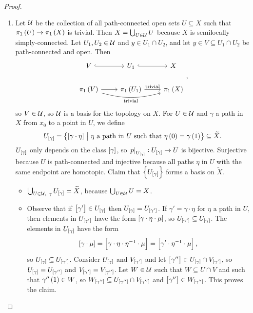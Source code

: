 \begin{proof}
\begin{enumerate}
\item Let $ \mathcal{U} $ be the collection of all path-connected open sets $ U \subseteq X $ such that $ \pi_1\br{U} \to \pi_1\br{X} $ is trivial. Then $ X = \bigcup_{U \in \mathcal{U}} U $ because $ X $ is semilocally simply-connected. Let $ U_1, U_2 \in \mathcal{U} $ and $ y \in U_1 \cap U_2 $, and let $ y \in V \subseteq U_1 \cap U_2 $ be path-connected and open. Then
$$
\begin{tikzcd}
V \arrow[hookrightarrow]{r} & U_1 \arrow[hookrightarrow]{r} & X \\
\pi_1\br{V} \arrow{r} \arrow[bend right=15, swap]{rr}{\text{trivial}} & \pi_1\br{U_1} \arrow{r}{\text{trivial}} & \pi_1\br{X}
\end{tikzcd},
$$
so $ V \in \mathcal{U} $, so $ \mathcal{U} $ is a basis for the topology on $ X $. For $ U \in \mathcal{U} $ and $ \gamma $ a path in $ X $ from $ x_0 $ to a point in $ U $, we define
$$ U_{\sbr{\gamma}} = \cbr{\sbr{\gamma \cdot \eta} \st \eta \ \text{a path in} \ U \ \text{such that} \ \eta\br{0} = \gamma\br{1}} \subseteq \widetilde{X}. $$
$ U_{\sbr{\gamma}} $ only depends on the class $ \sbr{\gamma} $, so $ \eval{p}_{U_{\sbr{\gamma}}} : U_{\sbr{\gamma}} \to U $ is bijective. Surjective because $ U $ is path-connected and injective because all paths $ \eta $ in $ U $ with the same endpoint are homotopic. Claim that $ \cbr{U_{\sbr{\gamma}}} $ forms a basis on $ \widetilde{X} $.
\begin{itemize}
\item $ \bigcup_{U \in \UUU, \ \gamma} U_{\sbr{\gamma}} = \widetilde{X} $, because $ \bigcup_{U \in \mathcal{U}} U = X $.
\item Observe that if $ \sbr{\gamma'} \in U_{\sbr{\gamma}} $ then $ U_{\sbr{\gamma}} = U_{\sbr{\gamma'}} $. If $ \gamma' = \gamma \cdot \eta $ for $ \eta $ a path in $ U $, then elements in $ U_{\sbr{\gamma'}} $ have the form $ \sbr{\gamma \cdot \eta \cdot \mu} $, so $ U_{\sbr{\gamma'}} \subseteq U_{\sbr{\gamma}} $. The elements in $ U_{\sbr{\gamma}} $ have the form
$$ \sbr{\gamma \cdot \mu} = \sbr{\gamma \cdot \eta \cdot \eta^{-1} \cdot \mu} = \sbr{\gamma' \cdot \eta^{-1} \cdot \mu}, $$
so $ U_{\sbr{\gamma}} \subseteq U_{\sbr{\gamma'}} $. Consider $ U_{\sbr{\gamma}} $ and $ V_{\sbr{\gamma'}} $ and let $ \sbr{\gamma''} \in U_{\sbr{\gamma}} \cap V_{\sbr{\gamma'}} $, so $ U_{\sbr{\gamma}} = U_{\sbr{\gamma''}} $ and $ V_{\sbr{\gamma'}} = V_{\sbr{\gamma''}} $. Let $ W \in \mathcal{U} $ such that $ W \subseteq U \cap V $ and such that $ \gamma''\br{1} \in W $, so $ W_{\sbr{\gamma''}} \subseteq U_{\sbr{\gamma''}} \cap V_{\sbr{\gamma''}} $ and $ \sbr{\gamma''} \in W_{\sbr{\gamma''}} $. This proves the claim.

\end{itemize}
\end{enumerate}
\end{proof}
